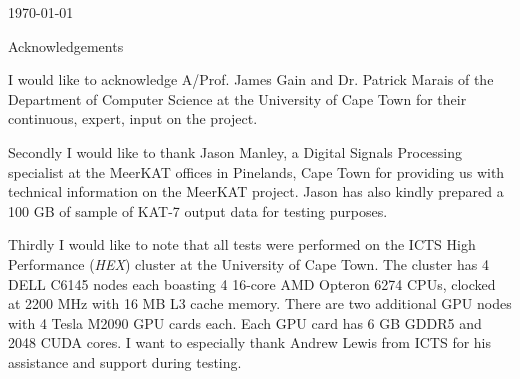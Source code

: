 \begin{titlepage}


{\large \today}\\[3cm] %


 

\vfill %

\end{titlepage}

\begin{center} 
  {\LARGE Acknowledgements}
\end{center}
\vspace{50pt}

I would like to acknowledge A/Prof. James Gain and Dr. Patrick Marais of the Department of Computer Science at the University of Cape Town for their continuous, expert, input on the project.

Secondly I would like to thank Jason Manley, a Digital Signals Processing specialist at the MeerKAT offices in Pinelands, Cape Town for providing us with technical information
on the MeerKAT project. Jason has also kindly prepared a 100 GB of sample of KAT-7 output data for testing purposes.

Thirdly I would like to note that all tests were performed on the ICTS High Performance (\textit{HEX}) cluster at the University of Cape Town. The cluster has 4 DELL C6145 nodes each boasting 4 16-core
AMD Opteron 6274 CPUs, clocked at 2200 MHz with 16 MB L3 cache memory. There are two additional GPU nodes with 4 Tesla M2090 GPU cards each. Each GPU card has 6 GB GDDR5 and 2048 CUDA cores. I want to 
especially thank Andrew Lewis from ICTS for his assistance and support during testing.

